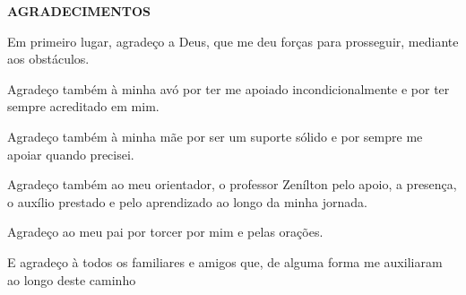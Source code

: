\begin{center}
	\normalsize
	\textbf{AGRADECIMENTOS}
	
	Em primeiro lugar, agradeço a Deus, que me deu forças para prosseguir, mediante aos obstáculos.
	
	Agradeço também à minha avó por ter me apoiado incondicionalmente e por ter sempre acreditado em mim.
	
	Agradeço também à minha mãe por ser um suporte sólido e por sempre me apoiar quando precisei.
	
	Agradeço também ao meu orientador, o professor Zenílton pelo apoio, a presença, o auxílio prestado e pelo aprendizado ao longo da minha jornada.
	
	Agradeço ao meu pai por torcer por mim e pelas orações.
	
	E agradeço à todos os familiares e amigos que, de alguma forma me auxiliaram ao longo deste caminho
\end{center}

 